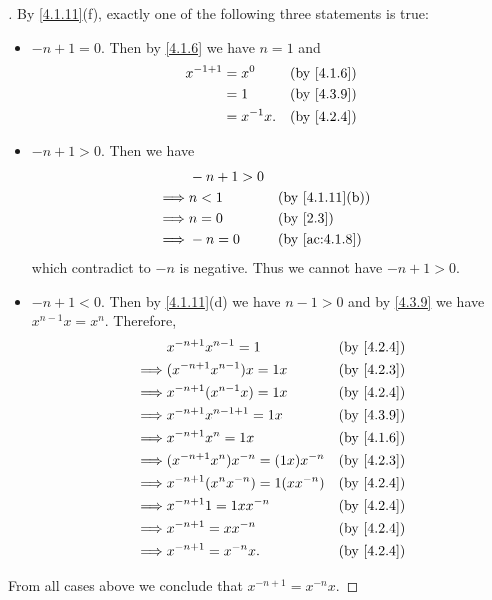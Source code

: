 \begin{proof}[]
  By \cref{4.1.11}(f), exactly one of the following three statements is true:
  \begin{itemize}
    \item \(-n + 1 = 0\).
          Then by \cref{4.1.6} we have \(n = 1\) and
          \begin{align*}
            x^{-1 + 1} & = x^0       &  & \by{4.1.6} \\
                       & = 1         &  & \by{4.3.9} \\
                       & = x^{-1} x. &  & \by{4.2.4}
          \end{align*}
    \item \(-n + 1 > 0\).
          Then we have
          \begin{align*}
                     & -n + 1 > 0                     \\
            \implies & n < 1      &  & \by{4.1.11}[b] \\
            \implies & n = 0      &  & \by{2.3}       \\
            \implies & -n = 0     &  & \by{ac:4.1.8}
          \end{align*}
          which contradict to \(-n\) is negative.
          Thus we cannot have \(-n + 1 > 0\).
    \item \(-n + 1 < 0\).
          Then by \cref{4.1.11}(d) we have \(n - 1 > 0\) and by \cref{4.3.9} we have \(x^{n - 1} x = x^n\).
          Therefore,
          \begin{align*}
                     & x^{-n + 1} x^{n - 1} = 1              &  & \by{4.2.4} \\
            \implies & (x^{-n + 1} x^{n - 1}) x = 1x         &  & \by{4.2.3} \\
            \implies & x^{-n + 1} (x^{n - 1} x) = 1x         &  & \by{4.2.4} \\
            \implies & x^{-n + 1} x^{n - 1 + 1} = 1x         &  & \by{4.3.9} \\
            \implies & x^{-n + 1} x^n = 1x                   &  & \by{4.1.6} \\
            \implies & (x^{-n + 1} x^n) x^{-n} = (1x) x^{-n} &  & \by{4.2.3} \\
            \implies & x^{-n + 1} (x^n x^{-n}) = 1(x x^{-n}) &  & \by{4.2.4} \\
            \implies & x^{-n + 1} 1 = 1x x^{-n}              &  & \by{4.2.4} \\
            \implies & x^{-n + 1} = x x^{-n}                 &  & \by{4.2.4} \\
            \implies & x^{-n + 1} = x^{-n} x.                &  & \by{4.2.4}
          \end{align*}
  \end{itemize}
  From all cases above we conclude that \(x^{-n + 1} = x^{-n} x\).
\end{proof}

